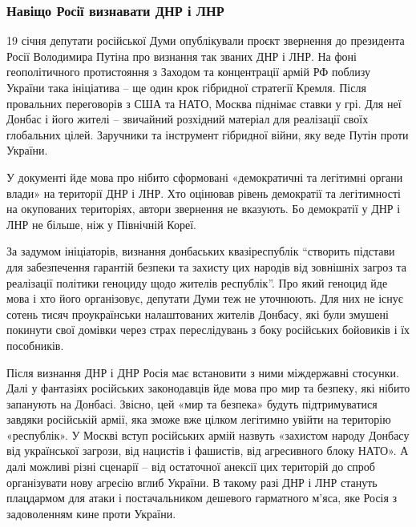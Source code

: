  
 
 
 
 

\subsubsection{Навіщо Росії визнавати ДНР і ЛНР}
\label{sec:21_01_2022.stz.news.ua.fromua.1.lnr_dnr_marionetki.1.navischo}

19 січня депутати російської Думи опублікували проєкт звернення до президента
Росії Володимира Путіна про визнання так званих ДНР і ЛНР. На фоні
геополітичного протистояння з Заходом та концентрації армій РФ поблизу України
така ініціатива – ще один крок гібридної стратегії Кремля. Після провальних
переговорів з США та НАТО, Москва піднімає ставки у грі. Для неї Донбас і його
жителі – звичайний розхідний матеріал для реалізації своїх глобальних цілей.
Заручники та інструмент гібридної війни, яку веде Путін проти України.

У документі йде мова про нібито сформовані «демократичні та легітимні органи
влади» на території ДНР і ЛНР. Хто оцінював рівень демократії та легітимності
на окупованих територіях, автори звернення не вказують. Бо демократії у ДНР і
ЛНР не більше, ніж у Північній Кореї.


За задумом ініціаторів, визнання донбаських квазіреспублік \enquote{створить підстави
для забезпечення гарантій безпеки та захисту цих народів від зовнішніх загроз
та реалізації політики геноциду щодо жителів республік}. Про який геноцид йде
мова і хто його організовує, депутати Думи теж не уточнюють. Для них не існує
сотень тисяч проукраїнськи налаштованих жителів Донбасу, які були змушені
покинути свої домівки через страх переслідувань з боку російських бойовиків і
їх пособників.

Після визнання ДНР і ДНР Росія має встановити з ними міждержавні стосунки. Далі
у фантазіях російських законодавців йде мова про мир та безпеку, які нібито
запанують на Донбасі. Звісно, цей «мир та безпека» будуть підтримуватися
завдяки російській армії, яка зможе вже цілком легітимно увійти на територію
«республік». У Москві вступ російських армій назвуть «захистом народу Донбасу
від української загрози, від нацистів і фашистів, від агресивного блоку НАТО».
А далі можливі різні сценарії – від остаточної анексії цих територій до спроб
організувати нову агресію вглиб України. В такому разі ДНР і ЛНР стануть
плацдармом для атаки і постачальником дешевого гарматного м’яса, яке Росія з
задоволенням кине проти України.

